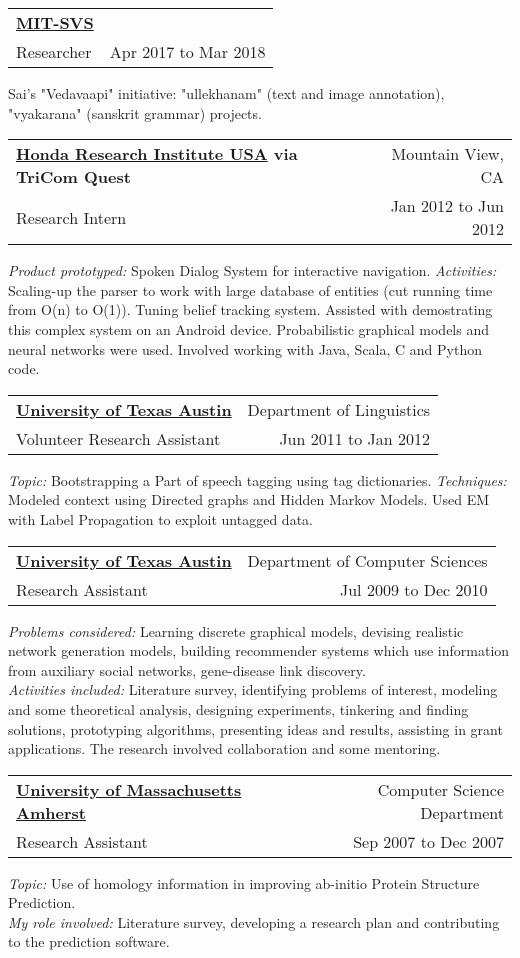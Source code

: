 \documentclass[biblist]{article}
\makeatletter
\newcommand{\resheading}[4]{
\begin{tabular*}{\columnwidth}{@{}l@{\extracolsep{\fill}}r@{}}
\textbf{#1} & #2 \\
#3 & #4 \\
\end{tabular*}}
\makeatother
\begin{document}
\resheading{\href{}{MIT-SVS}}
{}
{Researcher}
{Apr 2017 to Mar 2018}
Sai's "Vedavaapi" initiative: "ullekhanam" (text and image annotation), "vyakarana" (sanskrit grammar) projects.

\resheading{\href{http://www.honda-ri.com/HRI_Us/}{Honda Research Institute USA} via TriCom Quest}
{Mountain View, CA}
{Research Intern}
{Jan 2012 to Jun 2012}
\textit{Product prototyped:} Spoken Dialog System for interactive navigation.
\textit{Activities:} Scaling-up the parser to work with large database of entities (cut running time from O(n) to O(1)).
Tuning belief tracking system. Assisted with demostrating this complex system on an Android device. Probabilistic graphical models and neural networks were used. Involved working with Java, Scala, C and Python code.

\resheading{\href{http://www.cs.utexas.edu}{University of Texas Austin}}
{Department of Linguistics}
{Volunteer Research Assistant}
{Jun 2011 to Jan 2012}
\textit{Topic:} Bootstrapping a Part of speech tagging using tag dictionaries.
\textit{Techniques:} Modeled context using Directed graphs and Hidden Markov Models. Used EM with Label Propagation to exploit untagged data.

\resheading{\href{http://www.cs.utexas.edu}{University of Texas Austin}}
{Department of Computer Sciences}
{Research Assistant}
{Jul 2009 to Dec 2010}
\textit{Problems considered:} Learning discrete graphical models, devising realistic network generation models, building recommender systems which use information from auxiliary social networks, gene-disease link discovery. \\
\textit{Activities included:} Literature survey, identifying problems of interest, modeling and some theoretical analysis, designing experiments, tinkering and finding solutions, prototyping algorithms, presenting ideas and results, assisting in grant applications. The research involved collaboration and some mentoring.



\resheading{\href{http://cs.umass.edu}{University of Massachusetts Amherst}}
{Computer Science Department}
{Research Assistant}
{Sep 2007 to Dec 2007}
\textit{Topic:} Use of homology information in improving ab-initio Protein Structure Prediction. \\
\textit{My role involved:} Literature survey, developing a research plan and contributing to the prediction software.
\end{document}
